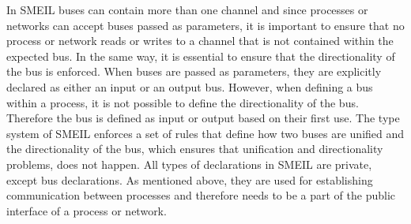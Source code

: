 In SMEIL buses can contain more than one channel and since processes or networks can accept buses passed as parameters, it is important to ensure that no process or network reads or writes to a channel that is not contained within the expected bus.
In the same way, it is essential to ensure that the directionality of the bus is enforced. When buses are passed as parameters, they are explicitly declared as either an input or an output bus. However, when defining a bus within a process, it is not possible to define the directionality of the bus. Therefore the bus is defined as input or output based on their first use.
The type system of SMEIL enforces a set of rules that define how two buses are unified and the directionality of the bus, which ensures that unification and directionality problems, does not happen.
All types of declarations in SMEIL are private, except bus declarations. As mentioned above, they are used for establishing communication between processes and therefore needs to be a part of the public interface of a process or network.

